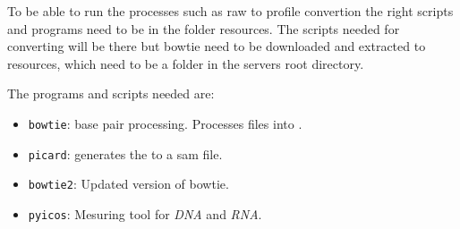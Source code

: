 To be able to run the processes such as raw to profile convertion the right scripts and programs need to be in the folder resources. The scripts needed for converting will be there but bowtie need to be downloaded and extracted to resources, which need to be a folder in the servers root directory.

The programs and scripts needed are:
\begin{itemize}
	\item \texttt{bowtie}: base pair processing. Processes  files into .
	\item \texttt{picard}: generates the  to a sam file.
	\item \texttt{bowtie2}: Updated version of bowtie.
	\item \texttt{pyicos}: Mesuring tool for \textit{DNA} and \textit{RNA}.
	
\end{itemize}
